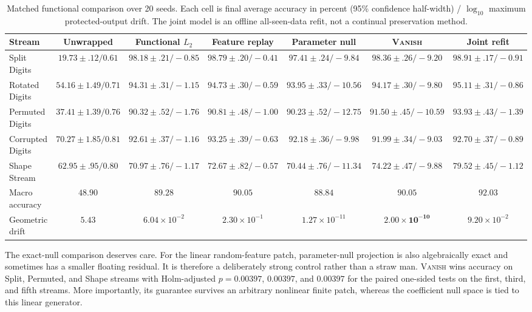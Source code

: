 \documentclass{vanish_ieee}
\theoremstyle{definition}
\newcommand{\VANISH}{\textsc{Vanish}}
\begin{document}
\begin{table}[t]
\centering
\caption{Matched functional comparison over 20 seeds.  Each cell is final average accuracy in percent (95\% confidence half-width) / $\log_{10}$ maximum protected-output drift.  The joint model is an offline all-seen-data refit, not a continual preservation method.}
\label{tab:functional}
\scriptsize
\begin{tabular}{lcccccc}
\toprule
Stream & Unwrapped & Functional $L_2$ & Feature replay & Parameter null & \textbf{\VANISH} & Joint refit\\
\midrule
Split Digits & $19.73{\pm}.12/0.61$ & $98.18{\pm}.21/-0.85$ & $98.79{\pm}.20/-0.41$ & $97.41{\pm}.24/-9.84$ & $\mathbf{98.36{\pm}.26/-9.20}$ & $98.91{\pm}.17/-0.91$\\
Rotated Digits & $54.16{\pm}1.49/0.71$ & $94.31{\pm}.31/-1.15$ & $94.73{\pm}.30/-0.59$ & $93.95{\pm}.33/-10.56$ & $\mathbf{94.17{\pm}.30/-9.80}$ & $95.11{\pm}.31/-0.86$\\
Permuted Digits & $37.41{\pm}1.39/0.76$ & $90.32{\pm}.52/-1.76$ & $90.81{\pm}.48/-1.00$ & $90.23{\pm}.52/-12.75$ & $\mathbf{91.50{\pm}.45/-10.59}$ & $93.93{\pm}.43/-1.39$\\
Corrupted Digits & $70.27{\pm}1.85/0.81$ & $92.61{\pm}.37/-1.16$ & $93.25{\pm}.39/-0.63$ & $92.18{\pm}.36/-9.98$ & $\mathbf{91.99{\pm}.34/-9.03}$ & $92.70{\pm}.37/-0.89$\\
Shape Stream & $62.95{\pm}.95/0.80$ & $70.97{\pm}.76/-1.17$ & $72.67{\pm}.82/-0.57$ & $70.44{\pm}.76/-11.34$ & $\mathbf{74.22{\pm}.47/-9.88}$ & $79.52{\pm}.45/-1.12$\\
\midrule
Macro accuracy & $48.90$ & $89.28$ & $90.05$ & $88.84$ & $\mathbf{90.05}$ & $92.03$\\
Geometric drift & $5.43$ & $6.04\!\times\!10^{-2}$ & $2.30\!\times\!10^{-1}$ & $1.27\!\times\!10^{-11}$ & $\mathbf{2.00\!\times\!10^{-10}}$ & $9.20\!\times\!10^{-2}$\\
\bottomrule
\end{tabular}
\end{table}

The exact-null comparison deserves care.  For the linear random-feature patch, parameter-null projection is also algebraically exact and sometimes has a smaller floating residual.  It is therefore a deliberately strong control rather than a straw man.  \VANISH{} wins accuracy on Split, Permuted, and Shape streams with Holm-adjusted $p=0.00397$, $0.00397$, and $0.00397$ for the paired one-sided tests on the first, third, and fifth streams.  More importantly, its guarantee survives an arbitrary nonlinear finite patch, whereas the coefficient null space is tied to this linear generator.
\end{document}
